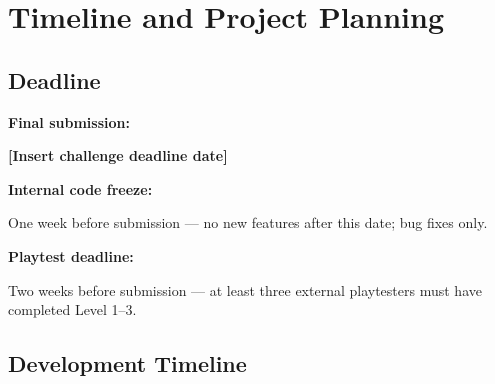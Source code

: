 \documentclass[12pt,a4paper]{article}
\newcommand{\gddfield}[2]{%
  \noindent\begin{minipage}[t]{3.5cm}\bfseries\color{accent}\sffamily#1\end{minipage}%
  \hspace{8pt}%
  \begin{minipage}[t]{\dimexpr\linewidth-3.5cm-8pt\relax}%
    #2
  \end{minipage}\par\smallskip}
\begin{document}
\section{Timeline and Project Planning}

\subsection{Deadline}

\begin{tcolorbox}[redbox, title={Submission Deadline}]
\gddfield{Final submission:}{\textbf{[Insert challenge deadline date]}}
\gddfield{Internal code freeze:}{One week before submission — no new features after this date; bug fixes only.}
\gddfield{Playtest deadline:}{Two weeks before submission — at least three external playtesters must have completed Level 1--3.}
\end{tcolorbox}

\subsection{Development Timeline}
\end{document}
